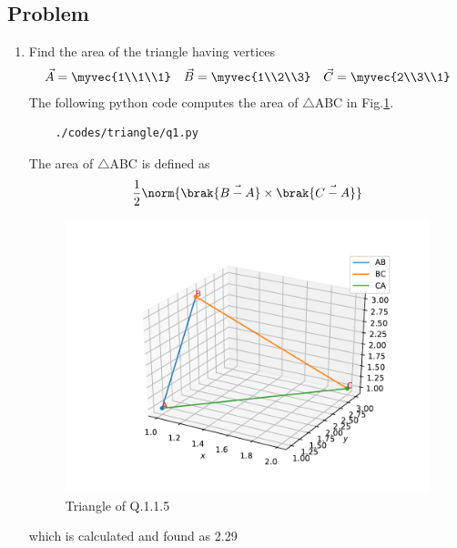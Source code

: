 \subsection{Problem}
\renewcommand{\theequation}{\theenumi}
\begin{enumerate}[label=\thesection.\arabic*.,ref=\thesection.\theenumi]
\item Find the area of the triangle having vertices 
\begin{multline}
	\vec{A} = \myvec{1\\1\\1}\quad
	\vec{B} = \myvec{1\\2\\3}\quad
	\vec{C} = \myvec{2\\3\\1}
\end{multline}
	The following python code computes the area of $\triangle$ABC in Fig.\ref{fig:qone}.
	\begin{lstlisting}
	./codes/triangle/q1.py
	\end{lstlisting}
	\solution The area of $\triangle$ABC is defined as
	\begin{align}
		\frac{1}{2}\norm{\brak{\vec{B-A}} \times \brak{\vec{C-A}}}
	\end{align}
	\begin{figure}[!ht]
	\centering
	\includegraphics[width=\columnwidth]{./figs/triangle/q1.pdf}
	\caption{Triangle of Q.1.1.5}
	\label{fig:qone}	
	\end{figure}
	which is calculated and found as 2.29
\end{enumerate}

